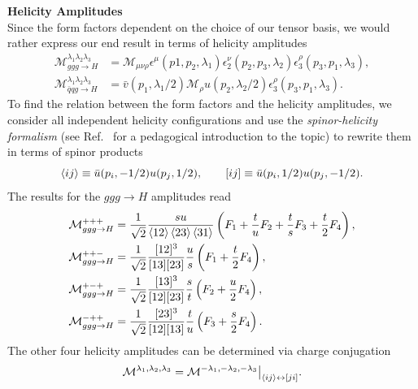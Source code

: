 \textbf{Helicity Amplitudes} \\
Since the form factors dependent on the choice of our tensor basis, we would rather express our end result in terms of helicity amplitudes
\begin{equation}
\begin{split}
\mathcal{M}^{\lambda_1 \lambda_2 \lambda_3}_{ggg \rightarrow H} &= \mathcal{M}_{\mu \nu \rho} \epsilon^\mu(p1, p_2, \lambda_1) \epsilon_2^\nu(p_2, p_3, \lambda_2) \epsilon_3^\rho(p_3, p_1, \lambda_3), \\
\mathcal{M}^{\lambda_1 \lambda_2 \lambda_3}_{\bar{q}q g \rightarrow H} &= \bar{v}(p_1, \lambda_1/2) \mathcal{M}_{\rho} u(p_2, \lambda_2/2)  \epsilon_3^\rho(p_3, p_1, \lambda_3).
\end{split}
\end{equation}
To find the relation between the form factors and the helicity amplitudes, we consider all independent helicity configurations and use the \textit{spinor-helicity formalism} (see Ref.~\cite{Dixon:1996wi} for a pedagogical introduction to the topic) to rewrite them in terms of spinor products
\begin{equation}
\braket{ij} \equiv \bar{u}(p_i, -1/2) u(p_j, 1/2), \qquad [ij] \equiv \bar{u}(p_i, 1/2) u(p_j, -1/2).
\end{equation}
The results for the $ggg \rightarrow H$ amplitudes read
\begin{equation}
\begin{split}
\mathcal{M}_{ggg\rightarrow H}^{+++} &= \frac{1}{\sqrt{2}} \frac{s u}{\braket{12} \braket{23} \braket{31}} \left( F_1 + \frac{t}{u} F_2 + \frac{t}{s} F_3 + \frac{t}{2} F_4 \right), \\
\mathcal{M}_{ggg\rightarrow H}^{++-} &= \frac{1}{\sqrt{2}} \frac{[12]^3}{[13][23]} \frac{u}{s} \left(F_1 + \frac{t}{2} F_4 \right), \\
\mathcal{M}_{ggg\rightarrow H}^{+-+} &= \frac{1}{\sqrt{2}} \frac{[13]^3}{[12][23]} \frac{s}{t} \left(F_2 + \frac{u}{2} F_4 \right), \\
\mathcal{M}_{ggg\rightarrow H}^{-++} &= \frac{1}{\sqrt{2}} \frac{[23]^3}{[12][13]} \frac{t}{u} \left(F_3 + \frac{s}{2} F_4 \right).
\end{split}
\end{equation}
The other four helicity amplitudes can be determined via charge conjugation
\begin{equation}
\mathcal{M}^{\lambda_1, \lambda_2, \lambda_3} = \mathcal{M}^{-\lambda_1, - \lambda_2, -\lambda_3} \big \vert_{\braket{ij} \leftrightarrow [ji]}.
\label{eq:5:parity}
\end{equation}
